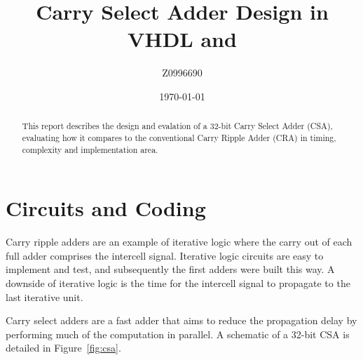 \documentclass[a4paper,11pt]{article}
\title{Carry Select Adder Design in VHDL and \Altera \QuartusII}
\author{Z0996690}
\date{\today}
\begin{document}
\begin{@twocolumnfalse} \centering
    \renewcommand{\abstractname}{\large Abstract}
    \begin{abstract}
        This report describes the design and evalation of a 32-bit Carry Select Adder (CSA), evaluating how it compares to the conventional Carry Ripple Adder (CRA) in timing, complexity and implementation area.
    \end{abstract}
\end{@twocolumnfalse}

\section{Circuits and Coding}

Carry ripple adders are an example of iterative logic where the carry out of each full adder comprises the intercell signal. Iterative logic circuits are easy to implement and test, and subsequently the first adders were built this way. A downside of iterative logic is the time for the intercell signal to propagate to the last iterative unit.

Carry select adders are a fast adder that aims to reduce the propagation delay by performing much of the computation in parallel. A schematic of a 32-bit CSA is detailed in Figure~\ref{fig:csa}.
\end{document}
